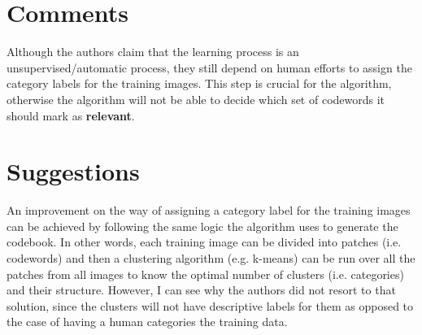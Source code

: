 \documentclass[11pt,a4paper]{article}
\begin{document}
\section{Comments}
Although the authors claim that the learning process is an unsupervised/automatic process, they still depend on human efforts to assign the category labels for
the training images. This step is crucial for the algorithm, otherwise the algorithm will not be able to decide which set of codewords it should mark as
\textbf{relevant}.

\section{Suggestions}
An improvement on the way of assigning a category label for the training images can be achieved by following the same logic the algorithm uses to generate the
codebook. In other words, each training image can be divided into patches (i.e. codewords) and then a clustering algorithm (e.g. k-means) can be run over all
the patches from all images to know the optimal number of clusters (i.e. categories) and their structure. However, I can see why the authors did not resort to
that solution, since the clusters will not have descriptive labels for them as opposed to the case of having a human categories the training data.



\nocite{*}

\end{document}
